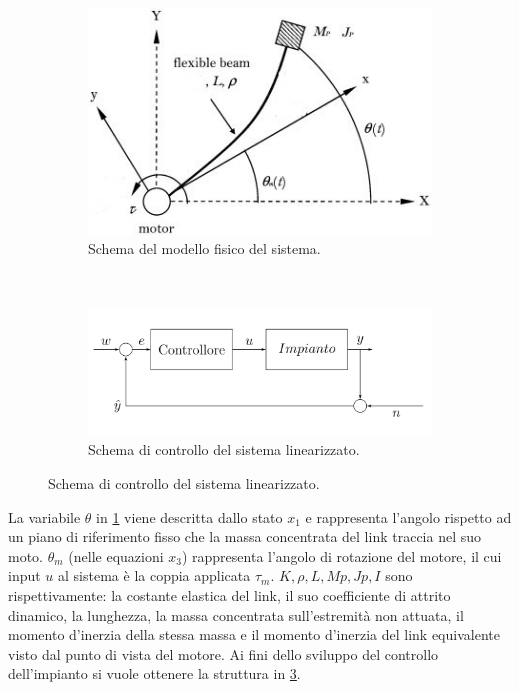 \documentclass[a4paper]{article}
\begin{document}
\begin{figure}[h]
    \centering
 \begin{subfigure}{0.45\textwidth}
    \centering
    \includegraphics[width=\textwidth]{schematic.png}
    \caption{Schema del modello fisico del sistema.}
    \label{fig:sys_schem}
 \end{subfigure}
 ~
 \begin{subfigure}{0.45\textwidth}
    \centering
    \includegraphics[width=\textwidth]{control_sys.png}
    \caption{Schema di controllo del sistema linearizzato.}
    \label{fig:sys_cont}
 \end{subfigure}
\end{figure}
La variabile $\theta$ in \cref{fig:sys_schem} viene descritta dallo stato $x_1$ e rappresenta l’angolo rispetto ad un piano di riferimento fisso che la massa concentrata del link traccia nel suo moto. $\theta_m$ (nelle equazioni $x_3$) rappresenta l’angolo di rotazione del motore, il cui input $u$ al sistema è la coppia applicata $\tau_m$. $K, \rho, L, Mp, Jp, I$ sono rispettivamente: la costante elastica del link, il suo coefficiente di attrito dinamico, la lunghezza, la massa concentrata sull’estremità non attuata, il momento d’inerzia della stessa massa e il momento d’inerzia del link equivalente visto dal punto di vista del motore.
Ai fini dello sviluppo del controllo dell’impianto si vuole ottenere la struttura in \cref{fig:sys_cont}.
\end{document}
